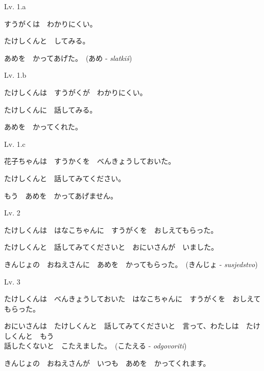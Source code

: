 
\author{Tomislav Mamić}

	
	\begin{mondai}{Lv. 1.a}
		\item すうがくは　わかりにくい。
		\item たけしくんと　してみる。
		\item あめを　かってあげた。　(あめ - \textit{slatkiš})
	\end{mondai}

	\begin{mondai}{Lv. 1.b}
		\item たけしくんは　すうがくが　わかりにくい。
		\item たけしくんに　話してみる。
		\item あめを　かってくれた。
	\end{mondai}

	\begin{mondai}{Lv. 1.c}
		\item 花子ちゃんは　すうかくを　べんきょうしておいた。
		\item たけしくんと　話してみてください。
		\item もう　あめを　かってあげません。
	\end{mondai}

	\begin{mondai}{Lv. 2}
		\item たけしくんは　はなこちゃんに　すうがくを　おしえてもらった。
		\item たけしくんと　話してみてくださいと　おにいさんが　いました。
		\item きんじょの　おねえさん\footnotemark[1]に　あめを　かってもらった。　(きんじょ - \textit{susjedstvo})
	\end{mondai}

	\begin{mondai}{Lv. 3}
		\item *たけしくんは　べんきょうしておいた　はなこちゃんに　すうがくを　おしえてもらった。
		\item おにいさんは　たけしくんと　話してみてくださいと　言って、わたしは　たけしくんと　もう\\話したくないと　こたえました。　(こたえる - \textit{odgovoriti})
		\item きんじょの　おねえさんが　いつも　あめを　かってくれます。
	\end{mondai}

